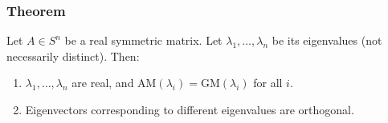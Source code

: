 \subsubsection{Theorem}

\begin{theorem}
    Let $A \in S^n$ be a real symmetric matrix. Let $\lambda_1, \dots, \lambda_n$ be its eigenvalues (not necessarily distinct). Then:
    \begin{enumerate}
        \item $\lambda_1, \dots, \lambda_n$ are real, and $\text{AM}(\lambda_i) = \text{GM}(\lambda_i)$ for all $i$.
        \item Eigenvectors corresponding to different eigenvalues are orthogonal.
    \end{enumerate}
\end{theorem}

